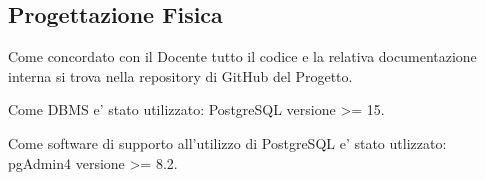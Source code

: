 \subsection{Progettazione Fisica}

Come concordato con il Docente tutto il codice e la relativa documentazione interna si trova
nella repository di GitHub del Progetto.

Come DBMS e' stato utilizzato: PostgreSQL versione >= 15.

Come software di supporto all'utilizzo di PostgreSQL e' stato utlizzato: pgAdmin4 versione >= 8.2.

